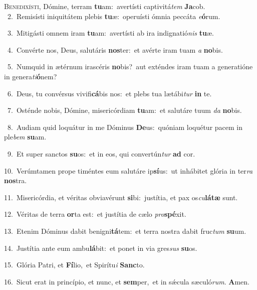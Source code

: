 \lettrine{\initial\textcolor{\initialcolor}{B}}{enedixísti,} Dómine, terram \textbf{tu}\-am:~\star avertísti captivitá\textit{tem} \textbf{Ja}\-cob.\\
{\numbfont\textcolor{\numbcolor}{~2.}}~Remisísti iniquitátem plebis \textbf{tu}\-æ:~\star operuísti ómnia peccáta \textit{e}\-\textbf{ó}rum.\par
{\numbfont\textcolor{\numbcolor}{~3.}}~Mitigásti omnem iram \textbf{tu}\-am:~\star avertísti ab ira indignatió\textit{nis} \textbf{tu}\-æ.\par
{\numbfont\textcolor{\numbcolor}{~4.}}~Convérte nos, Deus, salutáris \textbf{nos}\-ter:~\star et avérte iram tuam \textit{a} \textbf{no}\-bis.\par
{\numbfont\textcolor{\numbcolor}{~5.}}~Numquid in ætérnum irascéris \textbf{no}\-bis?~\star aut exténdes iram tuam a generatióne in genera\-\textit{ti}\-\textbf{ó}nem?\par
{\numbfont\textcolor{\numbcolor}{~6.}}~Deus, tu convérsus vivifi\-\textbf{cá}\-bis nos:~\star et plebs tua lætábi\textit{tur} \textbf{in} te.\par
{\numbfont\textcolor{\numbcolor}{~7.}}~Osténde nobis, Dómine, misericórdiam \textbf{tu}\-am:~\star et salutáre tuum \textit{da} \textbf{no}\-bis.\par
{\numbfont\textcolor{\numbcolor}{~8.}}~Audiam quid loquátur in me Dóminus \textbf{De}\-us:~\star quóniam loquétur pacem in ple\textit{bem} \textbf{su}\-am.\par
{\numbfont\textcolor{\numbcolor}{~9.}}~Et super sanctos \textbf{su}\-os:~\star et in eos, qui convertún\textit{tur} \textbf{ad} cor.\par
{\numbfont\textcolor{\numbcolor}{10.}}~Verúmtamen prope timéntes eum salutáre ip\-\textbf{sí}\-us:~\star ut inhábitet glória in ter\textit{ra} \textbf{nos}\-tra.\par
{\numbfont\textcolor{\numbcolor}{11.}}~Misericórdia, et véritas obviavérunt \textbf{si}\-bi:~\star justítia, et pax os\-\textit{cu}\-\textbf{lá}\textbf{tæ} sunt.\par
{\numbfont\textcolor{\numbcolor}{12.}}~Véritas de terra \textbf{or}\-ta est:~\star et justítia de cælo \textit{pro}\-\textbf{spé}xit.\par
{\numbfont\textcolor{\numbcolor}{13.}}~Etenim Dóminus dabit benigni\-\textbf{tá}\-tem:~\star et terra nostra dabit fruc\textit{tum} \textbf{su}\-um.\par
{\numbfont\textcolor{\numbcolor}{14.}}~Justítia ante eum ambu\-\textbf{lá}\-bit:~\star et ponet in via gres\textit{sus} \textbf{su}\-os.\par
{\numbfont\textcolor{\numbcolor}{15.}}~Glória Patri, et \textbf{Fí}\-lio,~\star et Spirítu\textit{i} \textbf{Sanc}\-to.\par
{\numbfont\textcolor{\numbcolor}{16.}}~Sicut erat in princípio, et nunc, et \textbf{sem}\-per,~\star et in sǽcula sæculó\-\textit{rum}\-. \textbf{A}\-men.\par
